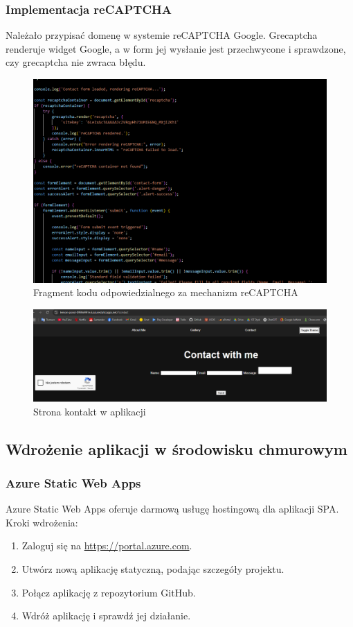 \documentclass[a4paper,12pt]{article}
\begin{document}
\subsubsection{Implementacja reCAPTCHA}

Należało przypisać domenę w systemie reCAPTCHA Google. Grecaptcha renderuje widget Google, a w form jej wysłanie jest przechwycone i sprawdzone, czy grecaptcha nie zwraca błędu.

\begin{figure}[H]
    \centering
    \includegraphics[width=1\textwidth]{images/recaptcha.png}
    \caption{Fragment kodu odpowiedzialnego za mechanizm reCAPTCHA}
\end{figure}

\begin{figure}[H]
    \centering
    \includegraphics[width=1\textwidth]{images/contact.png}
    \caption{Strona kontakt w aplikacji}
\end{figure}

\subsection{Wdrożenie aplikacji w środowisku chmurowym}
\subsubsection{Azure Static Web Apps}
Azure Static Web Apps oferuje darmową usługę hostingową dla aplikacji SPA. Kroki wdrożenia:
\begin{enumerate}
    \item Zaloguj się na \url{https://portal.azure.com}.
    \item Utwórz nową aplikację statyczną, podając szczegóły projektu.
    \item Połącz aplikację z repozytorium GitHub.
    \item Wdróż aplikację i sprawdź jej działanie.
\end{enumerate}
\end{document}
